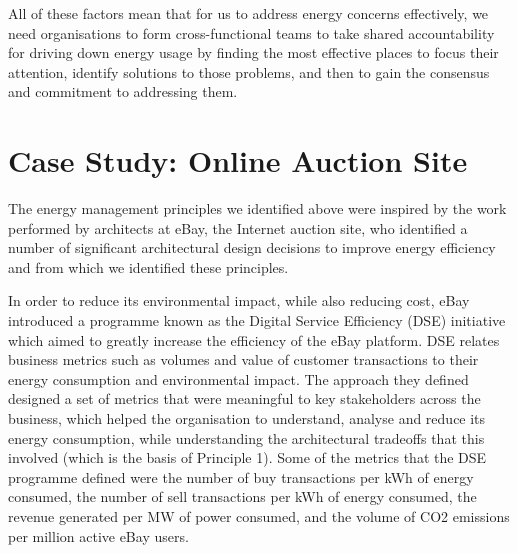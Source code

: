 All of these factors mean that for us to address energy concerns effectively, we need organisations to form cross-functional teams to take shared accountability for driving down energy usage by finding the most effective places to focus their attention, identify solutions to those problems, and then to gain the consensus and commitment to addressing them.

\section{Case Study: Online Auction Site}

The energy management principles we identified above were inspired by the work performed by architects at eBay, the Internet auction site, who identified a number of significant architectural design decisions to improve energy efficiency and from which we identified these principles.

In order to reduce its environmental impact, while also reducing cost, eBay introduced a programme known as the Digital Service Efficiency (DSE) initiative \cite{ebay2013-digitalefficiency} which aimed to greatly increase the efficiency of the eBay platform. DSE relates business metrics such as volumes and value of customer transactions to their energy consumption and environmental impact.   The approach they defined designed a set of metrics that were meaningful to key stakeholders across the business, which helped the organisation to understand, analyse and reduce its energy consumption, while understanding the architectural tradeoffs that this involved (which is the basis of Principle 1). Some of the metrics that the DSE programme defined were the number of buy transactions per kWh of energy consumed, the number of sell transactions per kWh of energy consumed, the revenue generated per MW of power consumed, and the volume of CO2 emissions per million active eBay users.

